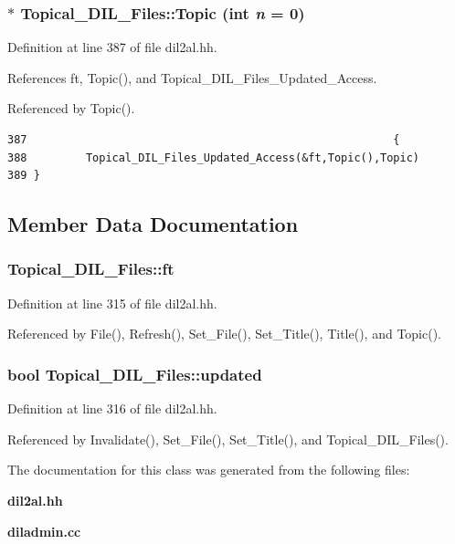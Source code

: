 \subsubsection{ $\ast$ Topical\_\-DIL\_\-Files::Topic (int {\em n} = 0)\hspace{0.3cm}{\tt  [inline]}}\label{classTopical__DIL__Files_a5}




Definition at line 387 of file dil2al.hh.

References ft, Topic(), and Topical\_\-DIL\_\-Files\_\-Updated\_\-Access.

Referenced by Topic().



\footnotesize\begin{verbatim}387                                                        {
388         Topical_DIL_Files_Updated_Access(&ft,Topic(),Topic)
389 }
\end{verbatim}\normalsize 


\subsection{Member Data Documentation}
\subsubsection{ Topical\_\-DIL\_\-Files::ft\hspace{0.3cm}{\tt  [protected]}}\label{classTopical__DIL__Files_n0}




Definition at line 315 of file dil2al.hh.

Referenced by File(), Refresh(), Set\_\-File(), Set\_\-Title(), Title(), and Topic().
\subsubsection{\setlength{\rightskip}{0pt plus 5cm}bool Topical\_\-DIL\_\-Files::updated\hspace{0.3cm}{\tt  [protected]}}\label{classTopical__DIL__Files_n1}




Definition at line 316 of file dil2al.hh.

Referenced by Invalidate(), Set\_\-File(), Set\_\-Title(), and Topical\_\-DIL\_\-Files().

The documentation for this class was generated from the following files:\begin{CompactItemize}
\item 
{\bf dil2al.hh}\item 
{\bf diladmin.cc}\end{CompactItemize}
